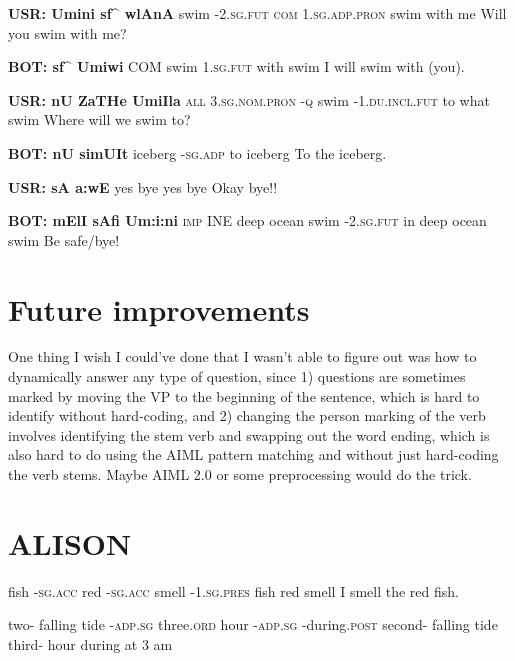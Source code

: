 \documentclass{article}
\newcommand{\h}{{$^h$}}
\newcommand{\R}{{\*r}}
\begin{document}
\textbf{USR: Umini sf\^{} wlAnA}
{swim -\textsc{2.sg.fut} \textsc{com} \textsc{1.sg.adp.pron}}
{swim {} with me}
{Will you swim with me?}

\textbf{BOT: sf\^{} Umiwi}
{\textsc{COM} swim \textsc{1.sg.fut}}
{with swim {}}
{I will swim with (you).}

\textbf{USR: nU ZaTHe UmiIla}
{\textsc{all} \textsc{3.sg.nom.pron} -\textsc{q} swim -\textsc{1.du.incl.fut}}
{to what {} swim {}}
{Where will we swim to?}

\textbf{BOT: nU simUIt}
\trigloss[preamble={\textipa{nU simUIt\h}}]
{\textipa{nU} \textipa{simU} -\textipa{it\h}}
{ iceberg \textsc{-sg.adp}}
{to iceberg {}}
{To the iceberg.}

\textbf{USR: sA a:wE}
{yes bye}
{yes bye}
{Okay bye!!}

\textbf{BOT: mElI sAfi Um:i:ni}
{\textsc{imp} \textsc{INE} {deep ocean} swim -\textsc{2.sg.fut}}
{{} in deep ocean swim {}}
{Be safe/bye!}


\section{Future improvements}
One thing I wish I could've done that I wasn't able to figure out was how to dynamically answer any type of question, since 1) questions are sometimes marked by moving the VP to the beginning of the sentence, which is hard to identify without hard-coding, and 2) changing the person marking of the verb involves identifying the stem verb and swapping out the word ending, which is also hard to do using the AIML pattern matching and without just hard-coding the verb stems.  Maybe AIML 2.0 or some preprocessing would do the trick.

\section{ALISON}
\trigloss[preamble={\textipa{S:eS:A\R{} SlImsAr HeiEt\h}}]
{\textipa{S:eS:} -\textipa{A\R} \textipa{SlIms} -\textipa{A\R} \textipa{Hei} -\textipa{et\h}}
{fish -\textsc{sg.acc} red -\textsc{sg.acc} smell -\textsc{1.sg.pres}}
{fish {} red {} smell}
{I smell the red fish.}


		{two- {falling tide} -\textsc{adp.sg} three\textsc{.ord} hour -\textsc{adp.sg} -during.\textsc{post} }
		{second- {falling tide} {} third- hour {} during }
		{at 3 am}
\end{document}
